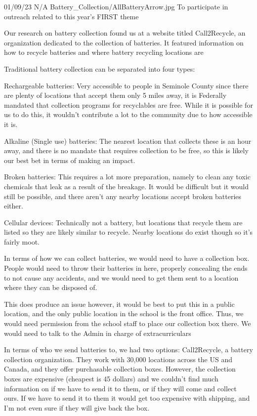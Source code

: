 {01/09/23}
{N/A}
{Battery_Collection/AllBatteryArrow.jpg}
{To participate in outreach related to this year's FIRST theme} 
{Our research on battery collection found us at a website titled Call2Recycle, an organization dedicated to the collection of batteries. It featured information on how to recycle batteries and where battery recycling locations are

Traditional battery collection can be separated into four types:

Rechargeable batteries: Very accessible to people in Seminole County since there are plenty of locations that accept them only 5 miles away, it is Federally mandated that collection programs for recyclables are free. While it is possible for us to do this, it wouldn't contribute a lot to the community due to how accessible it is.

Alkaline (Single use) batteries: The nearest location that collects these is an hour away, and there is no mandate that requires collection to be free, so this is likely our best bet in terms of making an impact.

Broken batteries: This requires a lot more preparation, namely to clean any toxic chemicals that leak as a result of the breakage. It would be difficult but it would still be possible, and there aren’t any nearby locations accept broken batteries either.

Cellular devices: Technically not a battery, but locations that recycle them are listed so they are likely similar to recycle. Nearby locations do exist though so it’s fairly moot.

In terms of how we can collect batteries, we would need to have a collection box. People would need to throw their batteries in here, properly concealing the ends to not cause any accidents, and we would need to get them sent to a location where they can be disposed of.

This does produce an issue however, it would be best to put this in a public location, and the only public location in the school is the front office. Thus, we would need permission from the school staff to place our collection box there. We would need to talk to the Admin in charge of extracurriculars

In terms of who we send batteries to, we had two options:
Call2Recycle, a battery collection organization. They work with 30,000 locations across the US and Canada, and they offer purchasable collection boxes. However, the collection boxes are expensive (cheapest is 45 dollars) and we couldn't find much information on if we have to send it to them, or if they will come and collect ours. If we have to send it to them it would get too expensive with shipping, and I'm not even sure if they will give back the box.

}
